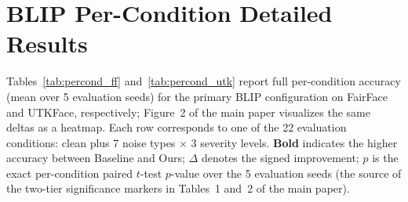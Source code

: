 
\section{BLIP Per-Condition Detailed Results}
\label{app:percond}

Tables~\ref{tab:percond_ff} and~\ref{tab:percond_utk} report full per-condition accuracy (mean over 5 evaluation seeds) for the primary BLIP configuration on FairFace and UTKFace, respectively; Figure~2 of the main paper visualizes the same deltas as a heatmap.
Each row corresponds to one of the 22 evaluation conditions: clean plus 7 noise types $\times$ 3 severity levels.
\textbf{Bold} indicates the higher accuracy between Baseline and Ours; $\Delta$ denotes the signed improvement; $p$ is the exact per-condition paired $t$-test $p$-value over the 5 evaluation seeds (the source of the two-tier significance markers in Tables~1 and~2 of the main paper).

